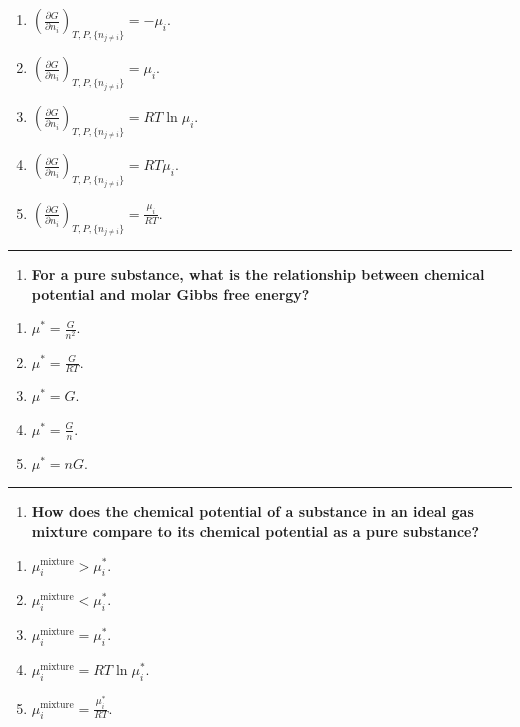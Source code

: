 \documentclass[
  9pt,
]{extbook}
\providecommand{\tightlist}{%
  \setlength{\itemsep}{0pt}\setlength{\parskip}{0pt}}
\theoremstyle{definition}
\theoremstyle{definition}
\theoremstyle{definition}
\theoremstyle{definition}
\theoremstyle{remark}
\begin{document}
\begin{enumerate}
\def\labelenumi{\alph{enumi}.}
\tightlist
\item
  \(\left(\frac{\partial G}{\partial n_i}\right)_{T,P,\{n_{j\neq i}\}} = -\mu_i\).
\item
  \(\left(\frac{\partial G}{\partial n_i}\right)_{T,P,\{n_{j\neq i}\}} = \mu_i\).
\item
  \(\left(\frac{\partial G}{\partial n_i}\right)_{T,P,\{n_{j\neq i}\}} = RT\ln\mu_i\).
\item
  \(\left(\frac{\partial G}{\partial n_i}\right)_{T,P,\{n_{j\neq i}\}} = RT\mu_i\).
\item
  \(\left(\frac{\partial G}{\partial n_i}\right)_{T,P,\{n_{j\neq i}\}} = \frac{\mu_i}{RT}\).
\end{enumerate}

\begin{center}\rule{0.5\linewidth}{0.5pt}\end{center}

\begin{enumerate}
\def\labelenumi{\arabic{enumi}.}
\setcounter{enumi}{7}
\tightlist
\item
  \textbf{For a pure substance, what is the relationship between chemical potential and molar Gibbs free energy?}
\end{enumerate}

\begin{enumerate}
\def\labelenumi{\alph{enumi}.}
\tightlist
\item
  \(\mu^* = \frac{G}{n^2}\).
\item
  \(\mu^* = \frac{G}{RT}\).
\item
  \(\mu^* = G\).
\item
  \(\mu^* = \frac{G}{n}\).
\item
  \(\mu^* = nG\).
\end{enumerate}

\begin{center}\rule{0.5\linewidth}{0.5pt}\end{center}

\begin{enumerate}
\def\labelenumi{\arabic{enumi}.}
\setcounter{enumi}{8}
\tightlist
\item
  \textbf{How does the chemical potential of a substance in an ideal gas mixture compare to its chemical potential as a pure substance?}
\end{enumerate}

\begin{enumerate}
\def\labelenumi{\alph{enumi}.}
\tightlist
\item
  \(\mu_i^{\text{mixture}} > \mu_i^*\).
\item
  \(\mu_i^{\text{mixture}} < \mu_i^*\).
\item
  \(\mu_i^{\text{mixture}} = \mu_i^*\).
\item
  \(\mu_i^{\text{mixture}} = RT\ln\mu_i^*\).
\item
  \(\mu_i^{\text{mixture}} = \frac{\mu_i^*}{RT}\).
\end{enumerate}
\end{document}
